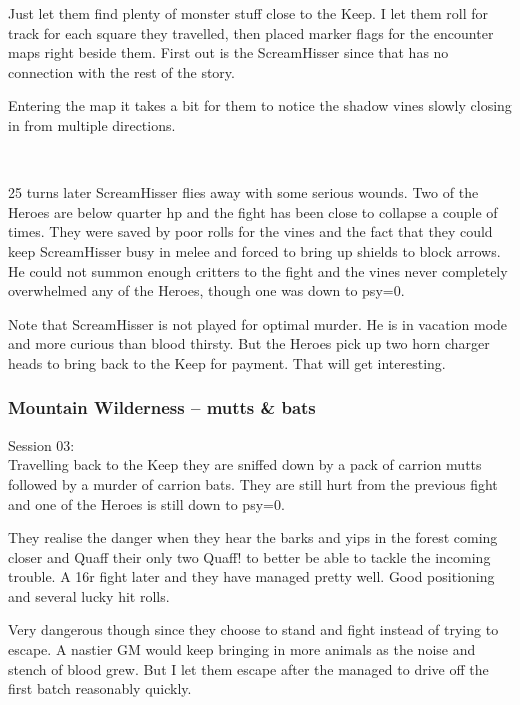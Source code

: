 \begin{readoutloud}
Just let them find plenty of monster stuff close to the Keep. I let them roll for track for each square they travelled, then placed marker flags for the encounter maps right beside them. First out is the ScreamHisser since that has no connection with the rest of the story.
\end{readoutloud}

Entering the map it takes a bit for them to notice the shadow vines slowly closing in from multiple directions.

\

25 turns later ScreamHisser flies away with some serious wounds. Two of the Heroes are below quarter hp and the fight has been close to collapse a couple of times. They were saved by poor rolls for the vines and the fact that they could keep ScreamHisser busy in melee and forced to bring up shields to block arrows. He could not summon enough critters to the fight and the vines never completely overwhelmed any of the Heroes, though one was down to psy=0.

\begin{readoutloud}
Note that ScreamHisser is not played for optimal murder. He is in vacation mode and more curious than blood thirsty. But the Heroes pick up two horn charger heads to bring back to the Keep for payment. That will get interesting.
\end{readoutloud}



\subsubsection*{Mountain Wilderness -- mutts \& bats}
\forceindent Session 03:\\                                              %
Travelling back to the Keep they are sniffed down by a pack of carrion mutts followed by a murder of carrion bats.
They are still hurt from the previous fight and one of the Heroes is still down to psy=0.

They realise the danger when they hear the barks and yips in the forest coming closer and Quaff their only two Quaff! to better be able to tackle the incoming trouble.
A 16r fight later and they have managed pretty well. Good positioning and several lucky hit rolls.

\begin{readoutloud}
Very dangerous though since they choose to stand and fight instead of trying to escape. A nastier GM would keep bringing in more animals as the noise and stench of blood grew. But I let them escape after the managed to drive off the first batch reasonably quickly.
\end{readoutloud}


